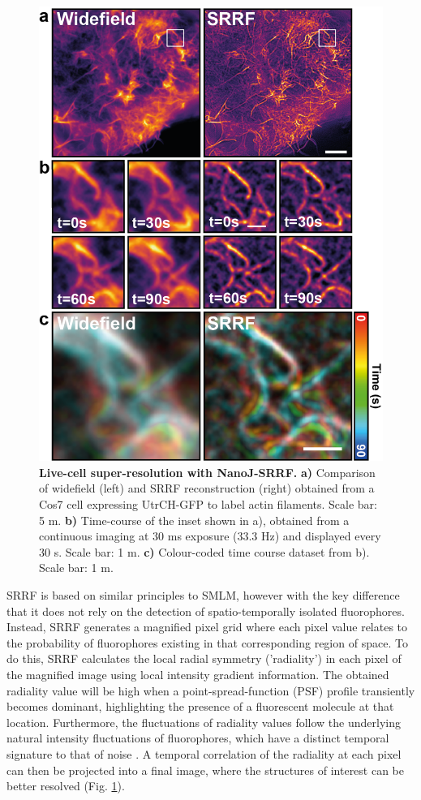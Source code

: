  \begin{figure}[!t]
    \centering
    \includegraphics{Figures/FigureSRRF_v5.png}
    \caption{\textbf{Live-cell super-resolution with NanoJ-SRRF.} \textbf{a)} Comparison of widefield (left) and SRRF reconstruction (right) obtained from a Cos7 cell expressing UtrCH-GFP to label actin filaments. Scale bar: 5 \micro m. \textbf{b)} Time-course of the inset shown in a), obtained from  a continuous imaging at 30 ms exposure (33.3 Hz) and displayed every 30 s. Scale bar: 1 \micro m. \textbf{c)} Colour-coded time course dataset from b). Scale bar: 1 \micro m.}
    \label{fig:SRRF}
 \end{figure}
 
 SRRF is based on similar principles to SMLM, however with the key difference that it does not rely on the detection of spatio-temporally isolated fluorophores. Instead, SRRF generates a magnified pixel grid where each pixel value relates to the probability of fluorophores existing in that corresponding region of space. To do this, SRRF calculates the local radial symmetry ('radiality') in each pixel of the magnified image using local intensity gradient information. The obtained radiality value will be high when a point-spread-function (PSF) profile transiently becomes dominant, highlighting the presence of a fluorescent molecule at that location. Furthermore, the fluctuations of radiality values follow the underlying natural intensity fluctuations of fluorophores, which have a distinct temporal signature to that of noise \cite{dertinger2009fast}. A temporal correlation of the radiality at each pixel can then be projected into a final image, where the structures of interest can be better resolved (Fig. \ref{fig:SRRF}).


